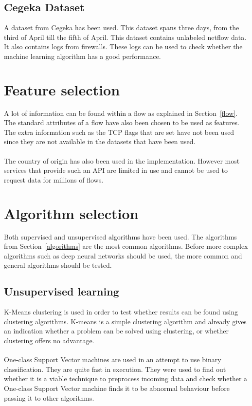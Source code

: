 \subsection{Cegeka Dataset}
A dataset from Cegeka has been used. This dataset spans three days, from the third of April till the  fifth of April. This dataset contains unlabeled netflow data. It also contains logs from firewalls. These logs can be used to check whether the machine learning algorithm has a good performance. 

\section{Feature selection}
A lot of information can be found within a flow as explained in Section~\ref{flow}. The standard attributes of a flow have also been chosen to be used as features. The extra information such as the TCP flags that are set have not been used since they are not available in the datasets that have been used. \\
\\
The country of origin has also been used  in the implementation. However most services that provide such an API are limited in use and cannot be used to request data for millions of flows.

\section{Algorithm selection}
Both supervised and unsupervised algorithms have been used. The algorithms from Section~\ref{algorithms} are the most common algorithms. Before more complex algorithms such as deep neural networks should be used, the more common and general algorithms should be tested. 

\subsection{Unsupervised learning}
K-Means clustering is used in order to test whether results can be found using clustering algorithms. K-means is a simple clustering algorithm and already gives an indication whether a problem can be solved using clustering, or whether clustering offers no advantage. \\
\\
One-class Support Vector machines are used in an attempt to use binary classification. They are quite fast in execution. They were used to find out whether it is a viable technique to preprocess incoming data and check whether a One-class Support Vector machine finds it to be abnormal behaviour before passing it to other algorithms.

